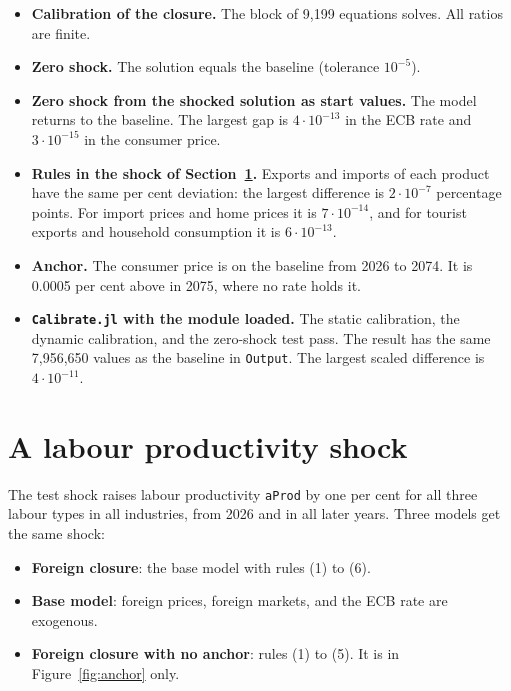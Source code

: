 \documentclass[11pt,a4paper]{article}
\newcommand{\code}[1]{\texttt{#1}}
\begin{document}
\begin{itemize}
\item \textbf{Calibration of the closure.} The block of 9{,}199 equations solves. All ratios are finite.
\item \textbf{Zero shock.} The solution equals the baseline (tolerance $10^{-5}$).
\item \textbf{Zero shock from the shocked solution as start values.} The model returns to the baseline. The largest gap is $4 \cdot 10^{-13}$ in the ECB rate and $3 \cdot 10^{-15}$ in the consumer price.
\item \textbf{Rules in the shock of Section~\ref{sec:shock}.} Exports and imports of each product have the same per cent deviation: the largest difference is $2 \cdot 10^{-7}$ percentage points. For import prices and home prices it is $7 \cdot 10^{-14}$, and for tourist exports and household consumption it is $6 \cdot 10^{-13}$.
\item \textbf{Anchor.} The consumer price is on the baseline from 2026 to 2074. It is 0.0005 per cent above in 2075, where no rate holds it.
\item \textbf{\code{Calibrate.jl} with the module loaded.} The static calibration, the dynamic calibration, and the zero-shock test pass. The result has the same 7{,}956{,}650 values as the baseline in \code{Output}. The largest scaled difference is $4 \cdot 10^{-11}$.
\end{itemize}

\section{A labour productivity shock}
\label{sec:shock}

The test shock raises labour productivity \code{aProd} by one per cent for all three labour types in all industries, from 2026 and in all later years.
Three models get the same shock:
\begin{itemize}
\item \textbf{Foreign closure}: the base model with rules (1) to (6).
\item \textbf{Base model}: foreign prices, foreign markets, and the ECB rate are exogenous.
\item \textbf{Foreign closure with no anchor}: rules (1) to (5). It is in Figure~\ref{fig:anchor} only.
\end{itemize}
\end{document}

